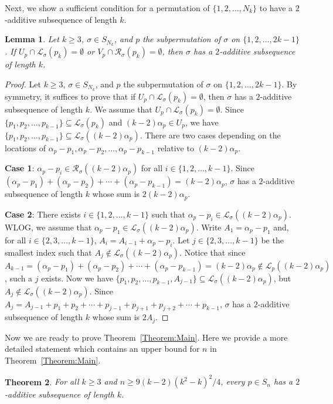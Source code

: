 \documentclass[10pt,a4paper]{amsart}
\newtheorem{theorem}{Theorem}[section]
\newtheorem{lemma}[theorem]{Lemma}
\begin{document}
Next, we show a sufficient condition for a permutation of $\{1,2,\ldots,N_k\}$ to have a $2$-additive subsequence of length $k$.    
\begin{lemma}\label{Lemma:NonEmptyIntersection}
    Let $k\geq3$, $\sigma\in S_{N_k}$, and $p$ the subpermutation of $\sigma$ on $\{1,2,\ldots,2k-1\}$. If $U_p\cap\mathcal{L}_\sigma(p_k)=\emptyset$ or $V_p\cap\mathcal{R}_\sigma(p_k)=\emptyset$, then $\sigma$ has a $2$-additive subsequence of length $k$.
\end{lemma}
\begin{proof}
    Let $k\geq3$, $\sigma\in S_{N_k}$, and $p$ the subpermutation of $\sigma$ on $\{1,2,\ldots,2k-1\}$. By symmetry, it suffices to prove that if $U_p\cap\mathcal{L}_\sigma(p_k)=\emptyset$, then $\sigma$ has a $2$-additive subsequence of length $k$. We assume that $U_p\cap\mathcal{L}_\sigma(p_k)=\emptyset$. Since $\{p_1,p_2,\ldots,p_{k-1}\}\subseteq\mathcal{L}_\sigma(p_k)$ and $(k-2)\alpha_p\in U_p$, we have $\{p_1,p_2,\ldots,p_{k-1}\}\subseteq\mathcal{L}_\sigma((k-2)\alpha_p)$. There are two cases depending on the locations of $\alpha_p-p_1,\alpha_p-p_2,\ldots,\alpha_p-p_{k-1}$ relative to $(k-2)\alpha_p$.

    {\bf Case 1}: $\alpha_p-p_i\in\mathcal{R}_\sigma((k-2)\alpha_p)$ for all $i\in\{1,2,\ldots,k-1\}$. Since $(\alpha_p-p_1)+(\alpha_p-p_2)+\cdots+(\alpha_p-p_{k-1})=(k-2)\alpha_p$, $\sigma$ has a $2$-additive subsequence of length $k$ whose sum is $2(k-2)\alpha_p$.

    {\bf Case 2}: There exists $i\in\{1,2,\ldots,k-1\}$ such that $\alpha_p-p_i\in\mathcal{L}_\sigma((k-2)\alpha_p)$. WLOG, we assume that $\alpha_p-p_1\in\mathcal{L}_\sigma((k-2)\alpha_p)$. Write $A_1=\alpha_p-p_1$ and, for all $i\in\{2,3,\ldots,k-1\}$, $A_i=A_{i-1}+\alpha_p-p_i$. Let $j\in\{2,3,\ldots,k-1\}$ be the smallest index such that $A_j\notin\mathcal{L}_\sigma((k-2)\alpha_p)$. Notice that since $A_{k-1}=(\alpha_p-p_1)+(\alpha_p-p_2)+\cdots+(\alpha_p-p_{k-1})=(k-2)\alpha_p\notin\mathcal{L}_p((k-2)\alpha_p)$, such a $j$ exists. Now we have $\{p_1,p_2,\ldots,p_{k-1},A_{j-1}\}\subseteq\mathcal{L}_\sigma((k-2)\alpha_p)$, but $A_j\notin\mathcal{L}_\sigma((k-2)\alpha_p)$. Since $A_j=A_{j-1}+p_1+p_2+\cdots+p_{j-1}+p_{j+1}+p_{j+2}+\cdots+p_{k-1}$, $\sigma$ has a $2$-additive subsequence of length $k$ whose sum is $2A_j$.
\end{proof}

Now we are ready to prove Theorem~\ref{Theorem:Main}. Here we provide a more detailed statement which contains an upper bound for $n$ in Theorem~\ref{Theorem:Main}.
\begin{theorem}\label{Theorem:Existence:Nonmonotone}
For all $k\geq3$ and $n\geq9(k-2)(k^2-k)^2/4$, every $p\in S_n$ has a $2$-additive subsequence of length $k$.
\end{theorem}
\end{document}
